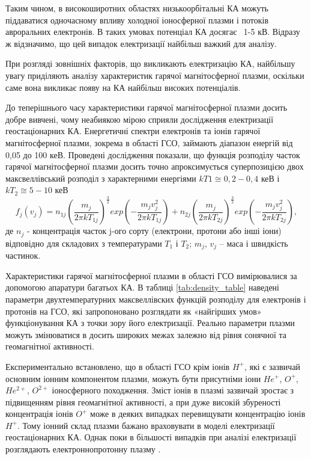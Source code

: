 \documentclass[a4paper,12pt]{article}
\begin{document}
Таким чином, в високоширотних областях низькоорбітальні КА можуть піддаватися одночасному впливу холодної іоносферної плазми і потоків авроральних електронів. В таких умовах потенціал КА досягає ~1-5 кВ. Відразу ж відзначимо, що цей випадок електризації найбільш важкий для аналізу.

При розгляді зовнішніх факторів, що викликають електризацію КА, найбільшу увагу приділяють аналізу характеристик гарячої магнітосферної плазми, оскільки саме вона викликає появу на КА найбільш високих потенціалів.

До теперішнього часу характеристики гарячої магнітосферної плазми досить добре вивчені, чому неабиякою мірою сприяли дослідження електризації геостаціонарних КА. Енергетичні спектри електронів та іонів гарячої магнітосферної плазми, зокрема в області ГСО, займають діапазон енергій від 0,05 до 100 кеВ. Проведені дослідження показали, що функція розподілу часток гарячої магнітосферної плазми досить точно апроксимується суперпозицією двох максвеллівський розподіл з характерними енергіями $kT1 \cong 0,2-0,4$ кеВ і $kT_2 \cong 5-10$ кеВ
\[
f_j(v_j) = n_{1j} \left( \frac{m_j}{2 \pi k T_{1j}} \right) ^\frac{3}{2} exp \left( - \frac{m_j v_j^2}{2 \pi k T_{1j}} \right) + n_{2j} \left( \frac{m_j}{2 \pi k T_{2j}} \right) ^\frac{3}{2} exp \left( - \frac{m_j v_j^2}{2 \pi k T_{2j}} \right),
\]
де $n_j$ - концентрація часток j-ого сорту (електрони, протони або інші іони) відповідно для складових з температурами $T_1$ і $T_2$; $m_j$, $v_j$ -- маса і швидкість частинок.

Характеристики гарячої магнітосферної плазми в області ГСО вимірювалися за допомогою апаратури багатьох КА. В таблиці \ref{tab:density_table} наведені параметри двухтемпературних максвеллівских функцій розподілу для електронів і протонів на ГСО, які запропоновано розглядати як «найгірших умов» функціонування КА з точки зору його електризації. Реально параметри плазми можуть змінюватися в досить широких межах залежно від рівня сонячної та геомагнітної активності.

Експериментально встановлено, що в області ГСО крім іонів $H^+$, які є зазвичай основним іонним компонентом плазми, можуть бути присутніми іони $He^+$, $O^+$, $He^{2+}$, $O^{2+}$ іоносферного походження. Зміст іонів в плазмі зазвичай зростає з підвищенням рівня геомагнітної активності, а при дуже високій збуреності концентрація іонів $O^+$ може в деяких випадках перевищувати концентрацію іонів $H^+$. Тому іонний склад плазми бажано враховувати в моделі електризації геостаціонарних КА. Однак поки в більшості випадків при аналізі електризації розглядають електроннопротонну плазму \cite{novikov}.
\end{document}
